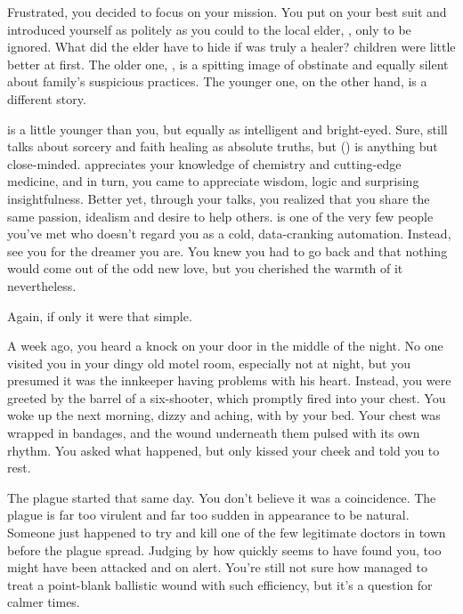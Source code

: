 \documentclass[char]{guildcamp4}
\begin{document}
Frustrated, you decided to focus on your mission. You put on your best suit and introduced yourself as politely as you could to the local elder, \cElder{\intro}, only to be ignored. What did the elder have to hide if \cElder{\they} was truly a healer? \cElder{\Their} children were little better at first. The older one, \cApprentice{}, is a spitting image of \cApprentice{\their} obstinate \cElder{\parent} and equally silent about \cApprentice{\their} family's suspicious practices. The younger one, on the other hand, is a different story.

\cRebel{} is a little younger than you, but equally as intelligent and bright-eyed. Sure, \cRebel{\they} still talks about sorcery and faith healing as absolute truths, but \cRebel(\they) is anything but close-minded. \cRebel{} appreciates your knowledge of chemistry and cutting-edge medicine, and in turn, you came to appreciate \cRebel{\their} wisdom, logic and surprising insightfulness. Better yet, through your talks, you realized that you share the same passion, idealism and desire to help others. \cRebel{} is one of the very few people you've met who doesn't regard you as a cold, data-cranking automation. Instead, \cRebel{\they} see you for the dreamer you are. You knew you had to go back and that nothing would come out of the odd new love, but you cherished the warmth of it nevertheless.

Again, if only it were that simple. 

A week ago, you heard a knock on your door in the middle of the night. No one visited you in your dingy old motel room, especially not at night, but you presumed it was the innkeeper having problems with his heart. Instead, you were greeted by the barrel of a six-shooter, which promptly fired into your chest. You woke up the next morning, dizzy and aching, with \cRebel{} by your bed. Your chest was wrapped in bandages, and the wound underneath them pulsed with its own rhythm. You asked \cRebel{} what happened, but \cRebel{\they} only kissed your cheek and told you to rest.

The plague started that same day. You don't believe it was a coincidence. The plague is far too virulent and far too sudden in appearance to be natural. Someone just happened to try and kill one of the few legitimate doctors in town before the plague spread. Judging by how quickly \cRebel{} seems to have found you, \cRebel{\they} too might have been attacked and on alert. You're still not sure how \cRebel{} managed to treat a point-blank ballistic wound with such efficiency, but it's a question for calmer times. 
\end{document}
